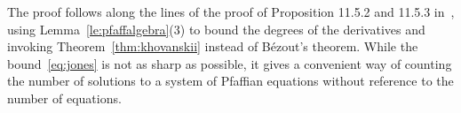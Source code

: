 The proof follows along the lines of the proof of Proposition 11.5.2 and 11.5.3 in~\cite{bochnak2013real}, using Lemma~\ref{le:pfaffalgebra}(3) to bound the degrees of the derivatives and invoking 
Theorem~\ref{thm:khovanskii} instead of B\'ezout's theorem. While the bound~\eqref{eq:jones} is not as sharp as possible, it gives a convenient way of counting the number of solutions to a system of Pfaffian
equations without reference to the number of equations.

